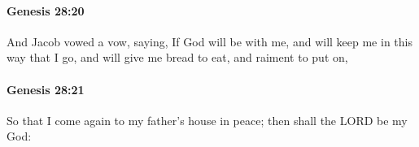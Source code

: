 		\paragraph{Genesis 28:20} %
			\label{GENESIS-28-20}

			And Jacob vowed a vow, saying, If God will be with me, and will keep me in this way that I go, and will give me bread to eat, and raiment to put on,


		\paragraph{Genesis 28:21} %
			\label{GENESIS-28-21}

			So that I come again to my father's house in peace; then shall the LORD be my God:


